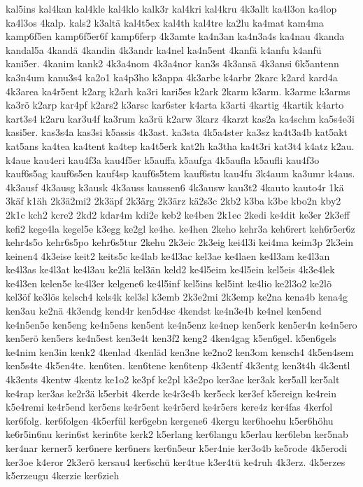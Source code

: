 {kal5ins
kal4kan
kal4kle
kal4klo
kalk3r
kal4kri
kal4kru
4k3allt
ka4l3on
ka4lop
ka4l3os
4kalp.
kals2
k3altä
kal4t5ex
kal4th
kal4tre
ka2lu
ka4mat
kam4ma
kamp6f5en
kamp6f5er6f
kamp6ferp
4k3amte
ka4n3an
ka4n3a4s
ka4nau
4kanda
kandal5a
4kandä
4kandin
4k3andr
ka4nel
ka4n5ent
4kanfä
k4anfu
k4anfü
kani5er.
4kanim
kank2
4k3a4nom
4k3a4nor
kan3s
4k3ansä
4k3ansi
6k5antenn
ka3n4um
kanu3s4
ka2o1
ka4p3ho
k3appa
4k3arbe
k4arbr
2karc
k2ard
kard4a
4k3area
ka4r5ent
k2arg
k2arh
ka3ri
kari5es
k2ark
2karm
k3arm.
k3arme
k3arms
ka3rö
k2arp
kar4pf
k2ars2
k3arsc
kar6ster
k4arta
k3arti
4kartig
4kartik
k4arto
kart3s4
k2aru
kar3u4f
ka3rum
ka3rü
k2arw
3karz
4karzt
kas2a
ka4schm
ka5s4e3i
kasi5er.
kas3s4a
kas3si
k5assis
4k3ast.
ka3sta
4k5a4ster
ka3sz
ka4t3a4b
kat5akt
kat5ans
ka4tea
ka4tent
ka4tep
ka4t5erk
kat2h
ka3tha
ka4t3ri
kat3t4
k4atz
k2au.
k4aue
kau4eri
kau4f3a
kau4f5er
k5auffa
k5aufga
4k5aufla
k5aufli
kau4f3o
kauf6s5ag
kauf6s5en
kauf4sp
kauf6s5tem
kauf6stu
kau4fu
3k4aum
ka3umr
k4aus.
4k3ausf
4k3ausg
k3ausk
4k3auss
kaussen6
4k3ausw
kau3t2
4kauto
kauto4r
1kä
3käf
k1äh
2k3ä2mi2
2k3äpf
2k3ärg
2k3ärz
kä2s3c
2kb2
k3ba
k3be
kbo2n
kby2
2k1c
kch2
kcre2
2kd2
kdar4m
kdi2e
keb2
ke4ben
2k1ec
2kedi
ke4dit
ke3er
2k3eff
kefi2
kege4la
kegel5e
k3egg
ke2gl
ke4he.
ke4hen
2keho
kehr3a
keh6rert
keh6r5er6z
kehr4s5o
kehr6s5po
kehr6s5tur
2kehu
2k3eic
2k3eig
kei4l3i
kei4ma
keim3p
2k3ein
keinen4
4k3eise
keit2
keits5c
ke4lab
ke4l3ac
kel3ae
ke4laen
ke4l3am
ke4l3an
ke4l3as
ke4l3at
ke4l3au
ke2lä
kel3än
keld2
ke4l5eim
ke4l5ein
kel5eis
4k3e4lek
ke4l3en
kelen5e
ke4l3er
kelgene6
ke4l5inf
kel5ins
kel5int
ke4lio
ke2l3o2
ke2lö
kel3öf
ke3lös
kelsch4
kels4k
kel3sl
k3emb
2k3e2mi
2k3emp
ke2na
kena4b
kena4g
ken3au
ke2nä
4k3endg
kend4r
ken5d4sc
4kendst
ke4n3e4b
ke4nel
ken5end
ke4n5en5e
ken5eng
ke4n5ens
ken5ent
ke4n5enz
ke4nep
ken5erk
ken5er4n
ke4n5ero
ken5erö
ken5ers
ke4n5est
ken3e4t
ken3f2
keng2
4ken4gag
k5en6gel.
k5en6gels
ke4nim
ken3in
kenk2
4kenlad
4kenläd
ken3ne
ke2no2
ken3om
kensch4
4k5en4sem
ken5s4te
4k5en4te.
ken6ten.
ken6tene
ken6tenp
4k3entf
4k3entg
ken3t4h
4k3entl
4k3ents
4kentw
4kentz
ke1o2
ke3pf
ke2pl
k3e2po
ker3ae
ker3ak
ker5all
ker5alt
ke4rap
ker3as
ke2r3ä
k5erbit
4kerde
ke4r3e4b
ker5eck
ker3ef
k5ereign
ke4rein
k5e4remi
ke4r5end
ker5ens
ke4r5ent
ke4r5erd
ke4r5ers
kere4z
ker4fas
4kerfol
ker6folg.
ker6folgen
4k5erfül
ker6gebn
kergene6
4kergu
ker6hoehu
k5er6höhu
ke6r5in6nu
kerin6st
kerin6te
kerk2
k5erlang
ker6langu
k5erlau
ker6lebn
ker5nab
ker4nar
kerner5
ker6nere
ker6ners
ker6n5eur
k5er4nie
ker3o4b
ke5rode
4k5erodi
ker3oe
k4eror
2k3erö
kersau4
ker6schü
ker4tue
k3er4tü
ke4ruh
4k3erz.
4k5erzes
k5erzeugu
4kerzie
ker6zieh
}
